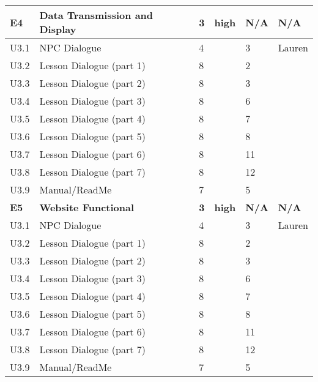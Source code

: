 \begin{longtable}[h!]{|p{1cm}|p{8.6cm}|p{1cm}|p{1.2cm}|p{1.2cm}|p{1.3cm}|}
	\midrule

	\textbf{E4}   & \textbf{Data Transmission and Display } & \textbf{3} & \textbf{high} & \textbf{N/A} & \textbf{N/A}\\
    \hline
    U3.1 & NPC Dialogue    & 4 & & 3 & Lauren\\
    \hline
    U3.2 & Lesson Dialogue (part 1) & 8 & & 2 & \\
    \hline
    U3.3 & Lesson Dialogue (part 2) & 8 & & 3 & \\
    \hline
    U3.4 & Lesson Dialogue (part 3) & 8 & & 6 & \\
    \hline
    U3.5 & Lesson Dialogue (part 4) & 8 & & 7 & \\
    \hline
    U3.6 & Lesson Dialogue (part 5) & 8 & & 8 & \\
    \hline
    U3.7 & Lesson Dialogue (part 6) & 8 & & 11 & \\
    \hline
    U3.8 & Lesson Dialogue (part 7) & 8 & & 12 & \\
    \hline
    U3.9 & Manual/ReadMe   & 7 & & 5 & \\
    \hline
    
	\midrule

	\textbf{E5}   & \textbf{Website Functional } & \textbf{3} & \textbf{high} & \textbf{N/A} & \textbf{N/A}\\
    \hline
    U3.1 & NPC Dialogue    & 4 & & 3 & Lauren\\
    \hline
    U3.2 & Lesson Dialogue (part 1) & 8 & & 2 & \\
    \hline
    U3.3 & Lesson Dialogue (part 2) & 8 & & 3 & \\
    \hline
    U3.4 & Lesson Dialogue (part 3) & 8 & & 6 & \\
    \hline
    U3.5 & Lesson Dialogue (part 4) & 8 & & 7 & \\
    \hline
    U3.6 & Lesson Dialogue (part 5) & 8 & & 8 & \\
    \hline
    U3.7 & Lesson Dialogue (part 6) & 8 & & 11 & \\
    \hline
    U3.8 & Lesson Dialogue (part 7) & 8 & & 12 & \\
    \hline
    U3.9 & Manual/ReadMe   & 7 & & 5 & \\
    \hline
    

\end{longtable}
